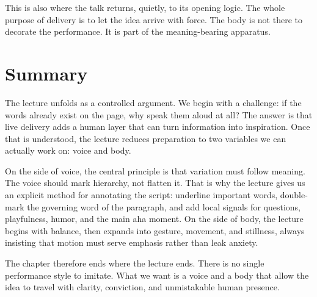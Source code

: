 This is also where the talk returns, quietly, to its opening logic. The whole purpose of delivery is to let the idea arrive with force. The body is not there to decorate the performance. It is part of the meaning-bearing apparatus.

\section{Summary}

The lecture unfolds as a controlled argument. We begin with a challenge: if the words already exist on the page, why speak them aloud at all? The answer is that live delivery adds a human layer that can turn information into inspiration. Once that is understood, the lecture reduces preparation to two variables we can actually work on: voice and body.

On the side of voice, the central principle is that variation must follow meaning. The voice should mark hierarchy, not flatten it. That is why the lecture gives us an explicit method for annotating the script: underline important words, double-mark the governing word of the paragraph, and add local signals for questions, playfulness, humor, and the main aha moment. On the side of body, the lecture begins with balance, then expands into gesture, movement, and stillness, always insisting that motion must serve emphasis rather than leak anxiety.

The chapter therefore ends where the lecture ends. There is no single performance style to imitate. What we want is a voice and a body that allow the idea to travel with clarity, conviction, and unmistakable human presence.